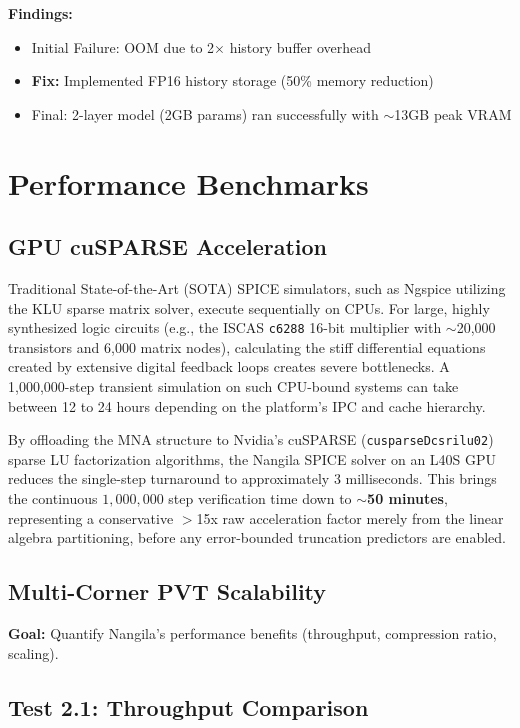 \documentclass[11pt,a4paper]{article}
\begin{document}
\textbf{Findings:}
\begin{itemize}
    \item Initial Failure: OOM due to 2$\times$ history buffer overhead
    \item \textbf{Fix:} Implemented FP16 history storage (50\% memory reduction)
    \item Final: 2-layer model (2GB params) ran successfully with $\sim$13GB peak VRAM
\end{itemize}

\section{Performance Benchmarks}

\subsection{GPU cuSPARSE Acceleration}
Traditional State-of-the-Art (SOTA) SPICE simulators, such as Ngspice utilizing the KLU sparse matrix solver, execute sequentially on CPUs. For large, highly synthesized logic circuits (e.g., the ISCAS \texttt{c6288} 16-bit multiplier with $\sim$20,000 transistors and 6,000 matrix nodes), calculating the stiff differential equations created by extensive digital feedback loops creates severe bottlenecks. A 1,000,000-step transient simulation on such CPU-bound systems can take between 12 to 24 hours depending on the platform's IPC and cache hierarchy.

By offloading the MNA structure to Nvidia's cuSPARSE (\texttt{cusparseDcsrilu02}) sparse LU factorization algorithms, the Nangila SPICE solver on an L40S GPU reduces the single-step turnaround to approximately 3 milliseconds. This brings the continuous $1,000,000$ step verification time down to \textbf{$\sim$50 minutes}, representing a conservative $>$15x raw acceleration factor merely from the linear algebra partitioning, before any error-bounded truncation predictors are enabled.

\subsection{Multi-Corner PVT Scalability} 
\textbf{Goal:} Quantify Nangila's performance benefits (throughput, compression ratio, scaling).

\subsection{Test 2.1: Throughput Comparison}
\end{document}
